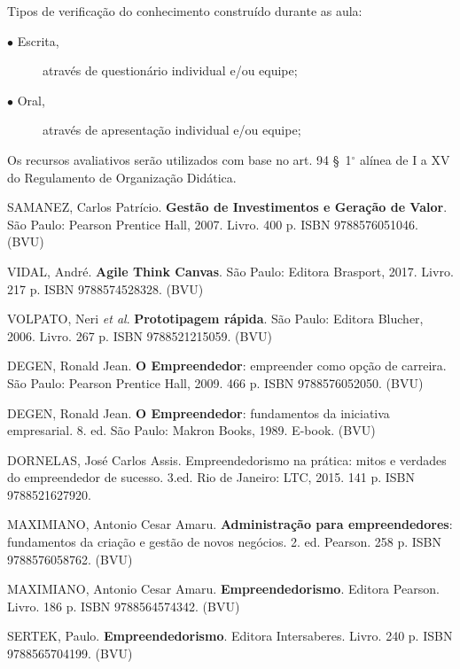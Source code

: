 \begin{pud}
    Tipos de verificação do conhecimento construído durante as aula: 
	\begin{description}
		\item[$\bullet$ Escrita,] através de questionário individual e/ou equipe;
		\item[$\bullet$ Oral,] através de apresentação individual e/ou equipe;
	\end{description}
	Os recursos avaliativos serão utilizados com base  no art. 94 \S~1$^\circ$ alínea de I a XV do Regulamento de Organização Didática.

	
	\begin{bibbasica}
	
		\item SAMANEZ, Carlos Patrício. \textbf{Gestão de Investimentos e Geração de Valor}. São Paulo: Pearson Prentice Hall, 2007. Livro. 400 p. ISBN 9788576051046. (BVU)
		\item VIDAL, André. \textbf{Agile Think Canvas}. São Paulo: Editora Brasport, 2017. Livro. 217 p. ISBN 9788574528328. (BVU)
		\item VOLPATO, Neri \textit{et al}.  \textbf{Prototipagem rápida}. São Paulo: Editora Blucher, 2006. Livro. 267 p. ISBN 9788521215059. (BVU)
		
		
	\end{bibbasica}
	
	\begin{bibcomplementar}
 	
 		\item DEGEN, Ronald Jean. \textbf{O Empreendedor}: empreender como opção de carreira. São Paulo: Pearson Prentice Hall, 2009. 466 p. ISBN 9788576052050. (BVU)
		\item DEGEN, Ronald Jean. \textbf{O Empreendedor}: fundamentos da iniciativa empresarial. 8. ed. São Paulo: Makron Books, 1989. E-book. (BVU)
		\item DORNELAS, José Carlos Assis. Empreendedorismo na prática: mitos e verdades do empreendedor de sucesso. 3.ed. Rio de Janeiro: LTC, 2015. 141 p. ISBN 9788521627920.
		\item MAXIMIANO, Antonio Cesar Amaru.  \textbf{Administração para empreendedores}: fundamentos da criação e gestão de novos negócios. 2. ed. Pearson. 258 p. ISBN 9788576058762. (BVU)
		\item MAXIMIANO, Antonio Cesar Amaru. \textbf{Empreendedorismo}. Editora Pearson. Livro. 186 p. ISBN 9788564574342. (BVU)
		\item SERTEK, Paulo. \textbf{Empreendedorismo}. Editora Intersaberes. Livro. 240 p. ISBN 9788565704199. (BVU)
		
	\end{bibcomplementar}
	
		
	
	
\end{pud}



